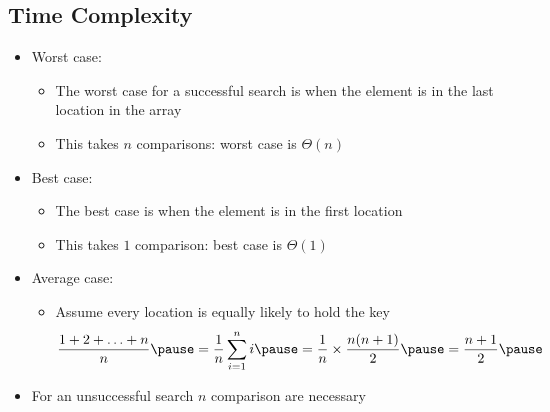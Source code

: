 
\begin{slide}
\section[-2.5]{Time Complexity}

\begin{PauseHighLight}
  \begin{itemize}\squeeze
  \item Worst case:\pause
    \begin{itemize}\squeeze
    \item The worst case for a successful search is when the element is
      in the last location in the array\pause
    \item This takes $n$ comparisons: worst case is $\Theta(n)$\pause
    \end{itemize}
  \item Best case:\pause
    \begin{itemize}\squeeze
    \item The best case is when the element is in the first location\pause
    \item This takes $1$ comparison: best case is $\Theta(1)$\pause
    \end{itemize}
  \item Average case:\pause
    \begin{itemize}\squeeze
    \item Assume every location is equally likely to hold the key
      \begin{align*}
        \frac{1+2+\ldots+n}{n}\pause = \frac{1}{n} \sum_{i=1}^n i \pause
        = \frac{1}{n} \times \frac{n(n+1)}{2}\pause = \frac{n+1}{2}\pause
      \end{align*}
    \end{itemize}
  \item For an unsuccessful search $n$ comparison are necessary\pause
  \end{itemize}
\end{PauseHighLight}

\end{slide}



